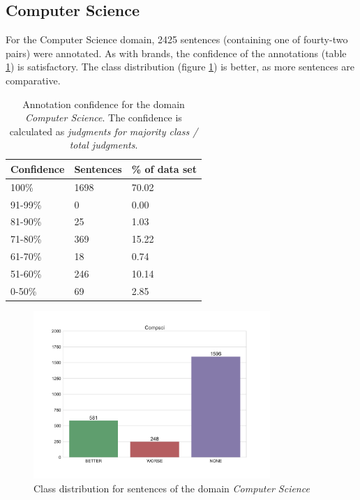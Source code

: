 \subsection{Computer Science}
For the Computer Science domain, 2425 sentences (containing one of fourty-two pairs) were annotated. As with brands, the confidence of the annotations (table \ref{fig:compsci_agg}) is satisfactory. The class distribution (figure \ref{fig:compsci_fin}) is better, as more sentences are comparative.

\begin{table}[h]
\caption{Annotation confidence for the domain \emph{Computer Science}. The confidence is calculated as \emph{judgments for majority class / total judgments}. }
\label{fig:compsci_agg}
\begin{tabularx}{\textwidth}{XXX}
\toprule
Confidence & Sentences & \% of data set \\
\midrule
100\%	&	1698	&	70.02	 \\ 
91-99\%	&	0	&	0.00	 \\ 
81-90\%	&	25	&	1.03	 \\ 
71-80\%	&	369	&	15.22	 \\ 
61-70\%	&	18	&	0.74	 \\ 
51-60\%	&	246	&	10.14	 \\ 
0-50\%	&	69	&	2.85	 \\ 
\bottomrule
\end{tabularx}
\end{table}

\begin{figure}[h]
\centering
\caption{Class distribution for sentences of the domain \emph{Computer Science}}
\label{fig:compsci_fin}
\includegraphics[width=0.8\textwidth]{images/dataset/Compsci-dist}
\end{figure}

